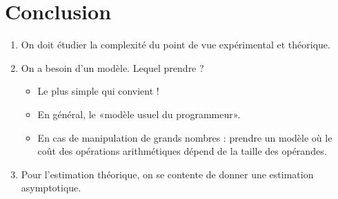 \section{Conclusion}

\begin{enumerate}
\item On doit étudier la complexité du point de vue expérimental et théorique.
\item On a besoin d'un modèle. Lequel prendre ?
  \begin{itemize}
  \item Le plus simple qui convient !
  \item En général, le «modèle usuel du programmeur».
  \item En cas de manipulation de grands nombres : prendre un modèle où le coût
    des opérations arithmétiques dépend de la taille des opérandes.
  \end{itemize}
\item Pour l'estimation théorique, on se contente de donner une
  estimation asymptotique.
\end{enumerate}

%
%
%
%
%
%
%
%
